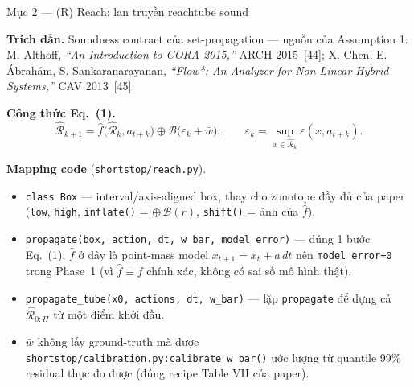 \documentclass[aspectratio=169]{beamer}
\begin{document}
\begin{frame}[t,shrink=8]{Mục 2 --- (R) Reach: lan truyền reachtube sound}

\textbf{Trích dẫn.} Soundness contract của set-propagation --- nguồn của Assumption 1:
M. Althoff, \emph{``An Introduction to CORA 2015,''} ARCH 2015~[44]; X. Chen, E. Ábrahám, S. Sankaranarayanan, \emph{``Flow*: An Analyzer for Non-Linear Hybrid Systems,''} CAV 2013~[45].

\vspace{5pt}
\textbf{Công thức Eq.~(1).}
\[
\hat{\mathcal R}_{k+1}=\hat f\bigl(\hat{\mathcal R}_k,a_{t+k}\bigr)\oplus \mathcal B\bigl(\varepsilon_k+\bar w\bigr),\qquad \varepsilon_k=\sup_{x\in\hat{\mathcal R}_k}\varepsilon(x,a_{t+k}).
\]

\vspace{5pt}
\textbf{Mapping code} (\texttt{shortstop/reach.py}).
\begin{itemize}
    \item \texttt{class Box} --- interval/axis-aligned box, thay cho zonotope đầy đủ của paper (\texttt{low}, \texttt{high}, \texttt{inflate()} = $\oplus\,\mathcal B(r)$, \texttt{shift()} = ảnh của $\hat f$).
    \item \texttt{propagate(box, action, dt, w\_bar, model\_error)} --- đúng 1 bước Eq.~(1); $\hat f$ ở đây là point-mass model $x_{t+1}=x_t+a\,dt$ nên \texttt{model\_error=0} trong Phase~1 (vì $\hat f\equiv f$ chính xác, không có sai số mô hình thật).
    \item \texttt{propagate\_tube(x0, actions, dt, w\_bar)} --- lặp \texttt{propagate} để dựng cả $\hat{\mathcal R}_{0:H}$ từ một điểm khởi đầu.
    \item $\bar w$ không lấy ground-truth mà được \texttt{shortstop/calibration.py:calibrate\_w\_bar()} ước lượng từ quantile 99\% residual thực đo được (đúng recipe Table VII của paper).
\end{itemize}
\end{frame}
\end{document}
